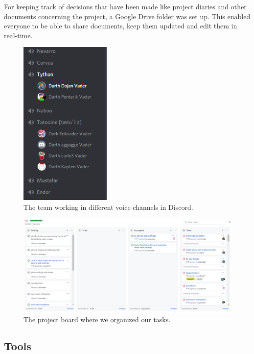 \documentclass[a4paper]{article}
\begin{document}
For keeping track of decisions that have been made like project diaries and other documents concerning the project, a Google Drive folder was set up. This enabled everyone to be able to share documents, keep them updated and edit them in real-time.

\begin{figure}
    \centering
    \includegraphics[width=0.4\textwidth]{pics/voice_channels.PNG}
    \caption{The team working in different voice channels in Discord.}
    \label{fig:voice_channels}
\end{figure}

\begin{figure}
    \centering
    \includegraphics[width=1\textwidth]{pics/project_board.PNG}
    \caption{The project board where we organized our tasks.}
    \label{fig:project_board}
\end{figure}

\subsection{Tools}
\end{document}
